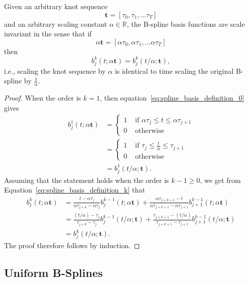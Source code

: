 \begin{lemma}\label{lem:bases_are_scale_invariant}
Given an arbitrary knot sequence
\[
\mathbf{t} = [\tau_0, \tau_1, \dots \tau_T]
\]
and an arbitrary scaling constant $\alpha\in\mathbb{R}$, the B-spline basis functions are scale invariant in the sense that
if 
\[
\alpha\mathbf{t} = [\alpha\tau_0, \alpha\tau_1, \dots \alpha\tau_T]
\]
then
\[
b_j^k(t; \alpha\mathbf{t}) = b_j^k(t/\alpha; \mathbf{t}),
\]
i.e., scaling the knot sequence by $\alpha$ is identical to time scaling the original B-spline by $\frac{1}{\alpha}$.
\end{lemma}
\begin{proof}
When the order is $k=1$, then equation~\eqref{eq:spline_basis_definition_0} gives
\begin{align*}
	b_j^1(t; \alpha\mathbf{t}) &= \begin{cases} 1 & \text{~if~} \alpha\tau_j \leq t \leq \alpha\tau_{j+1} \\ 
 									 				   0 & \text{~otherwise} 
 					   					 \end{cases} \\
 					   				   &= \begin{cases} 1 & \text{~if~} \tau_j \leq \frac{t}{\alpha} \leq \tau_{j+1} \\ 
 									 				   0 & \text{~otherwise} 
 					   					 \end{cases} \\ 	
 					   				   &= b_j^1(t/\alpha; \mathbf{t}).
\end{align*}
Assuming that the statement holds when the order is $k-1\geq 0$, we get from 
Equation~\eqref{eq:spline_basis_definition_k} that
\begin{align*}
b_j^k(t; \alpha\mathbf{t}) &= \frac{t-\alpha\tau_j}{\alpha\tau_{j+k}-
\alpha\tau_j} b_j^{k-1}(t; \alpha\mathbf{t}) + \frac{\alpha\tau_{j+k+1}-t}{\alpha\tau_{j+k+1}-\alpha\tau_{j+1}} b_{j+1}^{k-1}(t; \alpha\mathbf{t}) \\
&= \frac{(t/\alpha)-\tau_j}{\tau_{j+k}-
\tau_j} b_j^{k-1}(t/\alpha; \mathbf{t}) + \frac{\tau_{j+k+1}-(t/\alpha)}{\tau_{j+k+1}-\tau_{j+1}} b_{j+1}^{k-1}(t/\alpha; \mathbf{t}) \\
&= b_j^k(t/\alpha; \mathbf{t}).
\end{align*}
The proof therefore follows by induction.
\end{proof}


\subsection{Uniform B-Splines}

